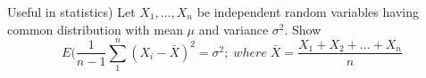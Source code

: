 \documentclass[12pt]{article}
\newenvironment{question}[2][Question]{\begin{trivlist}
\item[\hskip \labelsep {\bfseries #1}\hskip \labelsep {\bfseries #2.}]}{\end{trivlist}}
\begin{document}
\begin{question}{48}
(Useful in statistics) Let $X_1,\ldots,X_n$ be independent random variables having common distribution with mean $\mu$ and variance $\sigma^2$. Show
\[
E(\frac{1}{n-1}\sum_1^n{(X_i - \bar{X})^2} = \sigma^2;\; where\; \bar{X} = \frac{X_1 + X_2 + \ldots + X_n}{n}
\]
\end{question}
 
\end{document}
